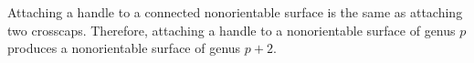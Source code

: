 Attaching a handle to a connected nonorientable surface is the same as attaching two crosscaps. Therefore, attaching a handle to a nonorientable surface of genus $p$ produces a nonorientable surface of genus $p + 2$.
